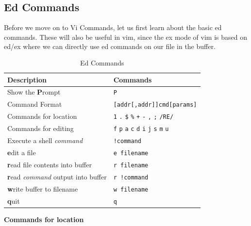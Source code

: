 \vfill
\pagebreak

\subsection{Ed Commands}

Before we move on to Vi Commands,
let us first learn about the basic ed commands.
These will also be useful in vim, since the
ex mode of vim is based on ed/ex where we can
directly use ed commands on our file in the buffer.

\begin{table}[h!]
  \caption{Ed Commands}
  \begin{tabular}{l l}
    \toprule
    Description & Commands \\
    \midrule
    Show the \textbf{P}rompt & \texttt{P} \\
    Command Format & \texttt{[addr[,addr]]cmd[params]} \\
    Commands for location & \texttt{1} \texttt{.} \texttt{\$} \texttt{\%} \texttt{+} \texttt{-} \texttt{,} \texttt{;} \texttt{/RE/} \\
    Commands for editing & \texttt{f} \texttt{p} \texttt{a} \texttt{c} \texttt{d} \texttt{i} \texttt{j} \texttt{s} \texttt{m} \texttt{u} \\
    Execute a shell \textit{command} & \texttt{!command} \\
    \textbf{e}dit a file & \texttt{e filename} \\
    \textbf{r}ead file contents into buffer & \texttt{r filename} \\
    \textbf{r}ead \textit{command} output into buffer & \texttt{r !command} \\
    \textbf{w}rite buffer to filename & \texttt{w filename} \\
    \textbf{q}uit & \texttt{q} \\
    \bottomrule
  \end{tabular}
\end{table}

\textbf{Commands for location}

